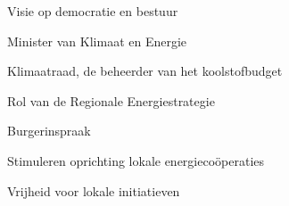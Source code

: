 
\begin{visie-concept}{Visie op democratie en bestuur}\end{visie-concept}

\begin{voorstel-concept}{Minister van Klimaat en Energie}\end{voorstel-concept}
\begin{voorstel-concept}{Klimaatraad, de beheerder van het koolstofbudget}\end{voorstel-concept}
\begin{voorstel-concept}{Rol van de Regionale Energiestrategie}\end{voorstel-concept}
\begin{voorstel-concept}{Burgerinspraak}\end{voorstel-concept}
\begin{voorstel-concept}{Stimuleren oprichting lokale energiecoöperaties}\end{voorstel-concept}
\begin{voorstel-concept}{Vrijheid voor lokale initiatieven}\end{voorstel-concept}
